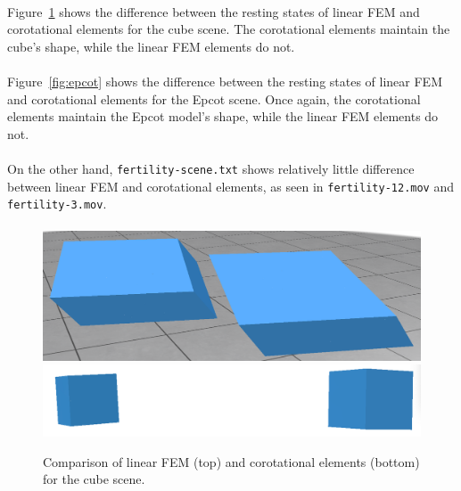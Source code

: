 \documentclass[12pt, a4paper]{article}
\begin{document}
    \paragraph{}
        Figure~\ref{fig:cube86} shows the difference between the resting states of
            linear FEM and corotational elements for the cube scene.
        The corotational elements maintain the cube's shape, while the linear FEM
            elements do not.

    \paragraph{}
        Figure~\ref{fig:epcot} shows the difference between the resting states of
            linear FEM and corotational elements for the Epcot scene.
        Once again, the corotational elements maintain the Epcot model's shape, while
            the linear FEM elements do not.

    \paragraph{}
        On the other hand, \texttt{fertility-scene.txt} shows relatively little
            difference between linear FEM and corotational elements, as seen in
            \texttt{fertility-12.mov} and \texttt{fertility-3.mov}.

    \paragraph{}
        \begin{figure}[H]
            \centering
            \includegraphics[width=\textwidth]{cube86-12.png}
            \includegraphics[width=\textwidth]{cube86-3.png}
                \caption{Comparison of linear FEM (top) and corotational elements (bottom) for the cube scene.}
                \label{fig:cube86}
        \end{figure}
\end{document}
